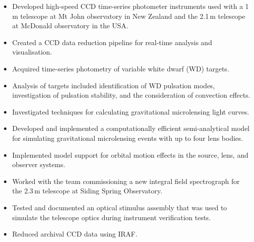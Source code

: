 \documentclass[print]{cv-style}
\begin{document}
\begin{entrylist}
  {
\begin{itemize}
	\item Developed high-speed CCD time-series photometer instruments used with a 1\,m telescope at Mt John observatory in New Zealand and the 2.1\,m telescope at McDonald observatory in the USA.
	\item Created a CCD data reduction pipeline for real-time analysis and visualisation.
	\item Acquired time-series photometry of variable white dwarf (WD) targets.
	\item Analysis of targets included identification of WD pulsation modes, investigation of pulsation stability, and the consideration of convection effects.
\end{itemize}}
  {
\begin{itemize}
	\item Investigated techniques for calculating gravitational microlensing light curves.
	\item Developed and implemented a computationally efficient semi-analytical model for simulating gravitational microlensing events with up to four lens bodies.
	\item Implemented model support for orbital motion effects in the source, lens, and observer systems.
  \end{itemize}}
  {
\begin{itemize}
	\item Worked with the team commissioning a new integral field spectrograph for the 2.3\,m telescope at Siding Spring Observatory.
	\item Tested and documented an optical stimulus assembly that was used to simulate the telescope optics during instrument verification tests.
	\item Reduced archival CCD data using IRAF.
  \end{itemize}}
\end{entrylist}
\end{document}
